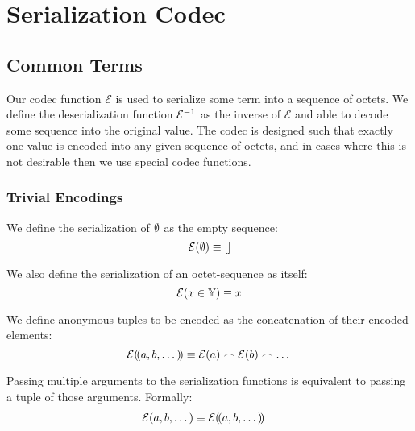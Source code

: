 \section{Serialization Codec}\label{sec:serialization}

\subsection{Common Terms}

Our codec function $\mathcal{E}$ is used to serialize some term into a sequence of octets. We define the deserialization function $\mathcal{E}^{-1}$ as the inverse of $\mathcal{E}$ and able to decode some sequence into the original value. The codec is designed such that exactly one value is encoded into any given sequence of octets, and in cases where this is not desirable then we use special codec functions.

\subsubsection{Trivial Encodings}
We define the serialization of $\emptyset$ as the empty sequence:
\begin{equation}
  \encode{\none} \equiv []
\end{equation}

We also define the serialization of an octet-sequence as itself:
\begin{equation}
  \encode{x \in \blob} \equiv x
\end{equation}

We define anonymous tuples to be encoded as the concatenation of their encoded elements:
\begin{equation}
  \encode{\tup{a, b, \dots}} \equiv \encode{a} \concat \encode{b} \concat \dots
\end{equation}

Passing multiple arguments to the serialization functions is equivalent to passing a tuple of those arguments. Formally:
\begin{align}
  \encode{a, b, \dots} &\equiv \encode{\tup{a, b, \dots}}
\end{align}


